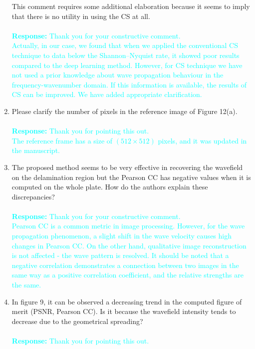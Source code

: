 \documentclass[11pt,a2paper]{report}
\begin{document}
\begin{enumerate}
		This comment requires some additional elaboration because it seems to imply that there is no utility in using the CS at all. 		
		\\	\\
		\textcolor{Cyan}
		{
			\textbf{Response:}
			Thank you for your constructive comment. \\
			Actually, in our case, we found that when we applied the conventional CS technique to data below the Shannon–Nyquist rate, it showed poor results compared to the deep learning method.
			However, for CS technique we have not used a prior knowledge about wave propagation behaviour in the frequency-wavenumber domain. 
			If this information is available, the results of CS can be improved. We have added appropriate clarification.
		} 
		\item Please clarify the number of pixels in the reference image of Figure 12(a). 
		\\ \\
		\textcolor{Cyan}
		{
			\textbf{Response:}
			Thank you for pointing this out. \\
			The reference frame has a size of \((512\times512)\) pixels, and it was updated in the manuscript.
		}	
		\item The proposed method seems to be very effective in recovering the wavefield on the delamination region but the Pearson CC has negative values when it is computed on the whole plate. 
		How do the authors explain these discrepancies?
		\\ \\
		\textcolor{Cyan}
		{
			\textbf{Response:}
			Thank you for your constructive comment.\\ 	
			Pearson CC is a common metric in image processing. 
			However, for the wave propagation phenomenon, a slight shift in the wave velocity causes high changes in Pearson CC. 
			On the other hand, qualitative image reconstruction is not affected - the wave pattern is resolved. 
			It should be noted that a negative correlation demonstrates a connection between two images in the same way as a positive correlation coefficient, and the relative strengths are the same.
		}
		\item In figure 9, it can be observed a decreasing trend in the computed figure of merit (PSNR, Pearson CC). 
		Is it because the wavefield intensity tends to decrease due to the geometrical spreading?
		\\ \\
		\textcolor{Cyan}
		{
			\textbf{Response:}
			Thank you for pointing this out. \\
}
\end{enumerate}
\end{document}

